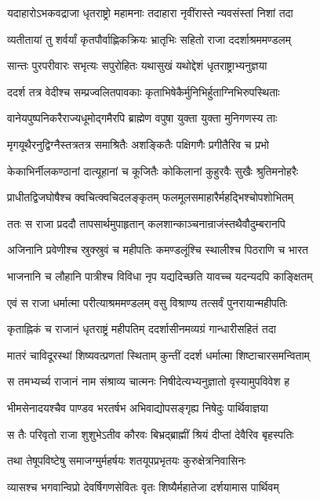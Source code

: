 \twolineshloka
{यदाहारोऽभकवद्राजा धृतराष्ट्रो महामनाः}
{तदाहारा नृवींरास्ते न्यवसंस्तां निशां तदा}


\twolineshloka
{व्यतीतायां तु शर्वर्यां कृतपौर्वाह्णिकक्रियः}
{भ्रातृभिः सहितो राजा ददर्शाश्रममण्डलम्}


\twolineshloka
{सान्तः पुरपरीवारः सभृत्यः सपुरोहितः}
{यथासुखं यथोद्देशं धृतराष्ट्राभ्यनुज्ञया}


\twolineshloka
{ददर्श तत्र वेदीश्च सम्प्रज्वलितपावकाः}
{कृताभिषेकैर्मुनिभिर्हुताग्निभिरुपस्थिताः}


\twolineshloka
{वानेयपुष्पनिकरैराज्यधूमोद्गमैरपि}
{ब्राह्मेण वपुषा युक्ता युक्ता मुनिगणस्य ताः}


\twolineshloka
{मृगयूथैरनुद्विग्नैस्तत्रतत्र समाश्रितैः}
{अशङ्कितैः पक्षिगणैः प्रगीतैरिव च प्रभो}


\twolineshloka
{केकाभिर्नीलकण्ठानां दात्यूहानां च कूजितैः}
{कोकिलानां कुहुरवैः सुखैः श्रुतिमनोहरैः}


\twolineshloka
{प्राधीतद्विजघोषैश्च क्वचित्क्वचिदलङ्कृतम्}
{फलमूलसमाहारैर्महद्भिश्चोपशोभितम्}


\twolineshloka
{ततः स राजा प्रददौ तापसार्थमुपाहृतान्}
{कलशान्काञ्चनान्राजंस्तथैवौदुम्बरानपि}


\twolineshloka
{अजिनानि प्रवेणीश्च स्रुक्स्रुवं च महीपतिः}
{कमण्डलूंश्चि स्थालीश्च पिठराणि च भारत}


\twolineshloka
{भाजनानि च लौहानि पात्रीश्च विविधा नृप}
{यद्यदिच्छति यावच्च यदन्यदपि काङ्क्षितम्}


\twolineshloka
{एवं स राजा धर्मात्मा परीत्याश्रममण्डलम्}
{वसु विश्राण्य तत्सर्वं पुनरायान्महीपतिः}


\twolineshloka
{कृताह्निकं च राजानं धृतराष्ट्रं महीपतिम्}
{ददर्शासीनमव्यग्रं गान्धारीसहितं तदा}


\twolineshloka
{मातरं चाविदूरस्थां शिष्यवत्प्रणतां स्थिताम्}
{कुन्तीं ददर्श धर्मात्मा शिष्टाचारसमन्विताम्}


\twolineshloka
{स तमभ्यर्च्य राजानं नाम संश्राव्य चात्मनः}
{निषीदेत्यभ्यनुज्ञातो वृस्यामुपविवेश ह}


\twolineshloka
{भीमसेनादयश्चैव पाण्डव भरतर्षभ}
{अभिवाद्योपसङ्गृह्य निषेदुः पार्थिवाज्ञया}


\twolineshloka
{स तैः परिवृतो राजा शुशुभेऽतीव कौरवः}
{बिभ्रद्ब्राह्मीं श्रियं दीप्तां देवैरिव बृहस्पतिः}


\twolineshloka
{तथा तेषूपविष्टेषु समाजग्मुर्महर्षयः}
{शतयूपप्रभृतयः कुरुक्षेत्रनिवासिनः}


\twolineshloka
{व्यासश्च भगवान्विप्रो देवर्षिगणसेवितः}
{वृतः शिष्यैर्महातेजा दर्शयामास पार्थिवम्}


